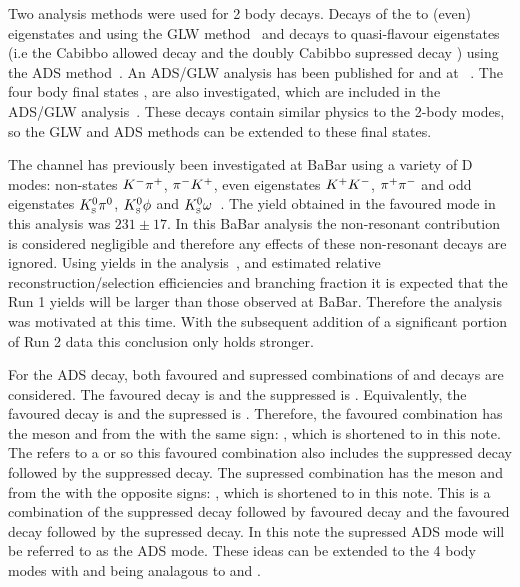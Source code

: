 Two analysis methods were used for 2 body \D decays. Decays of the \D to \CP (even) eigenstates \Kp\Km and \pip\pim using the GLW method~\cite{GL,GW} and decays to quasi-flavour eigenstates \Kpm\pimp (i.e the Cabibbo allowed decay \decay{\Dz}{\Km\pip} and the doubly Cabibbo supressed decay \decay{\Dz}{\pim\Kp}) using the ADS method~\cite{ADS,ADS-2001}. An ADS/GLW analysis has been published for  and \decay{\Bz}{\D\Kstarz} at \lhcb~\cite{LHCB-PAPER-2016-003,LHCB-PAPER-2014-028}. The four body final states \decay{\Dz}{\Km\pip\pim\pip}, \decay{\Dz}{\pip\pim\pip\pim} \decay{\Dz}{\Kp\pim\pip\pim} are also investigated, which are included in the  ADS/GLW analysis~\cite{LHCB-PAPER-2016-003}. These \Dz decays contain similar physics to the 2-body modes, so the GLW and ADS methods can be extended to these final states.

The \decay{\Bpm}{\D\Kstarpm} channel has previously been investigated at BaBar using a variety of D modes: non-\CP states ${{K}^-}{{\pi}^+}$, ${{\pi}^-}{{K}^+}$, \CP even eigenstates ${{K}^+}{{K}^-}$, ${{\pi}^+}{{\pi}^-}$ and \CP odd eigenstates ${{K}^0_{\mathrm{ \scriptscriptstyle S}}}{{\pi}^0}$, ${{K}^0_{\mathrm{ \scriptscriptstyle S}}}\phi$ and ${{K}^0_{\mathrm{ \scriptscriptstyle S}}}\omega$~\cite{BaBarDKstar}. The yield obtained in the favoured \decay{\Dz}{\Km\pip} mode in this analysis was $231 \pm 17$. In this BaBar analysis the non-resonant \decay{\B}{\D\KS\pi} contribution is considered negligible and therefore any effects of these non-resonant decays are ignored. Using yields in the \decay{\Bpm}{\D\Kpm} analysis~\cite{LHCB-PAPER-2016-003}, and estimated relative reconstruction/selection efficiencies and branching fraction it is expected that the Run 1 yields will be larger than those observed at BaBar. Therefore the analysis was motivated at this time. With the subsequent addition of a significant portion of Run 2 data this conclusion only holds stronger.

For the ADS decay, both favoured and supressed combinations of \Bm and \Dz decays are considered. The favoured \Bm decay is \decay{\Bm}{\Dz\Kstarm} and the suppressed is \decay{\Bm}{\Dzb\Kstarm}. Equivalently, the favoured \Dz decay is \decay{\Dz}{\Km\pip} and the supressed is \decay{\Dz}{\pim\Kp}. Therefore, the favoured combination has the \B meson and \kaon from the \D with the same sign: \decay{\Bm}{\D(\Km\pip)\Kstarm(\KS\pim)}, which is shortened to \decay{\Bm}{\D(\Km\pip)\Kstarm} in this note. The \D refers to a \Dz or \Dzb so this favoured combination also includes the suppressed \B decay followed by the suppressed \D decay. The supressed combination has the \B meson and \kaon from the \D with the opposite signs: \decay{\Bm}{\D(\Kp\pim)\Kstarm(\KS\pim)}, which is shortened to \decay{\Bm}{\D(\Kp\pim)\Kstarm} in this note. This is a combination of the suppressed \D decay followed by favoured \B decay and the favoured \B decay followed by the supressed \D decay. In this note the supressed ADS mode will be referred to as the ADS mode. These ideas can be extended to the 4 body modes with \decay{\Bm}{\D(\Km\pip\pim\pip)\Kstarm(\KS\pim)} and \decay{\Bm}{\D(\Kp\pim\pip\pim)\Kstarm(\KS\pim)} being analagous to \decay{\Bm}{\D(\Km\pip)\Kstarm(\KS\pim)} and \decay{\Bm}{\D(\Kp\pim)\Kstarm(\KS\pim)}.

